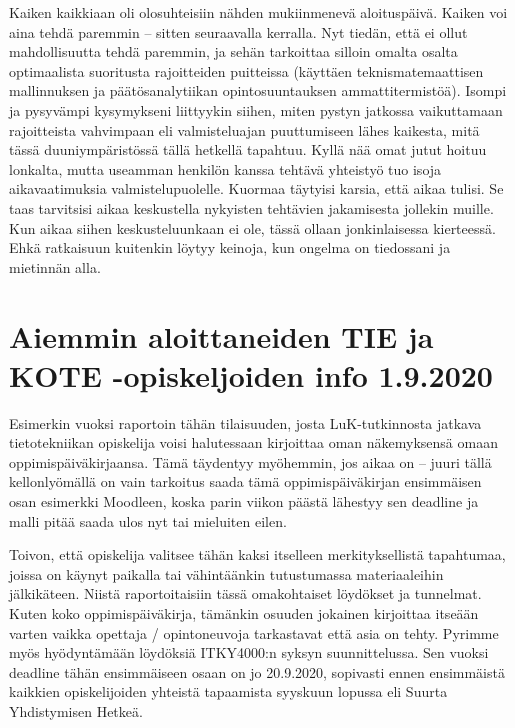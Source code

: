 \documentclass[utf8]{gradu3}
\begin{document}
Kaiken kaikkiaan oli olosuhteisiin nähden mukiinmenevä aloituspäivä. Kaiken voi
aina tehdä paremmin – sitten seuraavalla kerralla. Nyt tiedän, että ei ollut
mahdollisuutta tehdä paremmin, ja sehän tarkoittaa silloin omalta osalta
optimaalista suoritusta rajoitteiden puitteissa (käyttäen teknismatemaattisen
mallinnuksen ja päätösanalytiikan opintosuuntauksen ammattitermistöä). Isompi ja
pysyvämpi kysymykseni liittyykin siihen, miten pystyn jatkossa vaikuttamaan
rajoitteista vahvimpaan eli valmisteluajan puuttumiseen lähes kaikesta, mitä
tässä duuniympäristössä tällä hetkellä tapahtuu. Kyllä nää omat jutut hoituu
lonkalta, mutta useamman henkilön kanssa tehtävä yhteistyö tuo isoja
aikavaatimuksia valmistelupuolelle. Kuormaa täytyisi karsia, että aikaa tulisi.
Se taas tarvitsisi aikaa keskustella nykyisten tehtävien jakamisesta jollekin
muille. Kun aikaa siihen keskusteluunkaan ei ole, tässä ollaan jonkinlaisessa
kierteessä. Ehkä ratkaisuun kuitenkin löytyy keinoja, kun ongelma on tiedossani
ja mietinnän alla.

\section{Aiemmin aloittaneiden TIE ja KOTE -opiskeljoiden info 1.9.2020}

Esimerkin vuoksi raportoin tähän tilaisuuden, josta LuK-tutkinnosta jatkava
tietotekniikan opiskelija voisi halutessaan kirjoittaa oman näkemyksensä omaan
oppimispäiväkirjaansa. Tämä täydentyy myöhemmin, jos aikaa on – juuri tällä
kellonlyömällä on vain tarkoitus saada tämä oppimispäiväkirjan ensimmäisen osan
esimerkki Moodleen, koska parin viikon päästä lähestyy sen deadline ja malli
pitää saada ulos nyt tai mieluiten eilen.

Toivon, että opiskelija valitsee tähän kaksi itselleen merkityksellistä
tapahtumaa, joissa on käynyt paikalla tai vähintäänkin tutustumassa
materiaaleihin jälkikäteen. Niistä raportoitaisiin tässä omakohtaiset löydökset
ja tunnelmat. Kuten koko oppimispäiväkirja, tämänkin osuuden jokainen kirjoittaa
itseään varten vaikka opettaja / opintoneuvoja tarkastavat että asia on tehty.
Pyrimme myös hyödyntämään löydöksiä ITKY4000:n syksyn suunnittelussa. Sen vuoksi
deadline tähän ensimmäiseen osaan on jo 20.9.2020, sopivasti ennen ensimmäistä
kaikkien opiskelijoiden yhteistä tapaamista syyskuun lopussa eli Suurta
Yhdistymisen Hetkeä.
\end{document}
